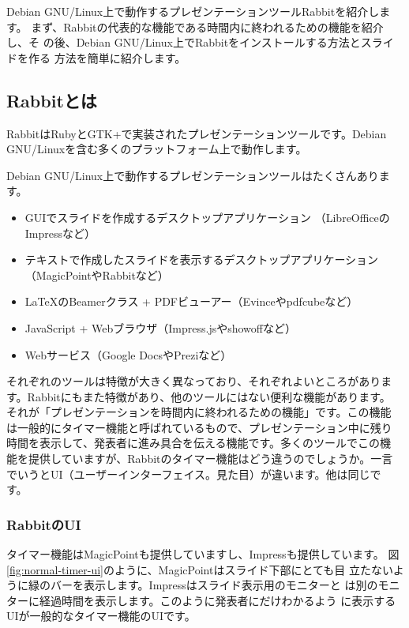 \documentclass[mingoth,a4paper]{jsarticle}
\begin{document}
\label{sec:kou}

Debian GNU/Linux上で動作するプレゼンテーションツールRabbitを紹介します。
まず、Rabbitの代表的な機能である時間内に終われるための機能を紹介し、そ
の後、Debian GNU/Linux上でRabbitをインストールする方法とスライドを作る
方法を簡単に紹介します。

\subsection{Rabbitとは}

RabbitはRubyとGTK+で実装されたプレゼンテーションツールです。Debian
GNU/Linuxを含む多くのプラットフォーム上で動作します。

Debian GNU/Linux上で動作するプレゼンテーションツールはたくさんあります。

\begin{itemize}
\item GUIでスライドを作成するデスクトップアプリケーション
  （LibreOfficeのImpressなど）
\item テキストで作成したスライドを表示するデスクトップアプリケーション
  （MagicPointやRabbitなど）
\item \LaTeX{}のBeamerクラス + PDFビューアー（Evinceやpdfcubeなど）
\item JavaScript + Webブラウザ（Impress.jsやshowoffなど）
\item Webサービス（Google DocsやPreziなど）
\end{itemize}

それぞれのツールは特徴が大きく異なっており、それぞれよいところがありま
す。Rabbitにもまた特徴があり、他のツールにはない便利な機能があります。
それが「プレゼンテーションを時間内に終われるための機能」です。この機能
は一般的にタイマー機能と呼ばれているもので、プレゼンテーション中に残り
時間を表示して、発表者に進み具合を伝える機能です。多くのツールでこの機
能を提供していますが、Rabbitのタイマー機能はどう違うのでしょうか。一言
でいうとUI（ユーザーインターフェイス。見た目）が違います。他は同じで
す。

\subsubsection{RabbitのUI}

タイマー機能はMagicPointも提供していますし、Impressも提供しています。
図\ref{fig:normal-timer-ui}のように、MagicPointはスライド下部にとても目
立たないように緑のバーを表示します。Impressはスライド表示用のモニターと
は別のモニターに経過時間を表示します。このように発表者にだけわかるよう
に表示するUIが一般的なタイマー機能のUIです。
\end{document}
